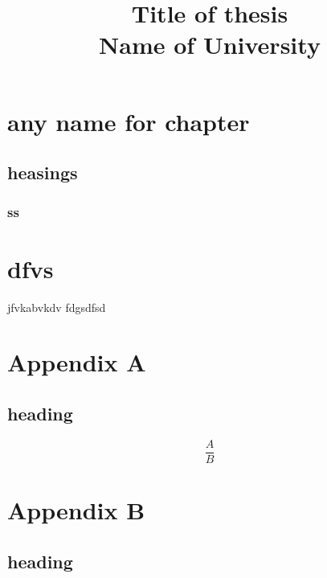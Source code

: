 \documentclass[12pt,twoside]{report}
\title{{Title of thesis}\\{\Large Name of University}}
\begin{document}
\maketitle
\tableofcontents
\listoffigures
\listoftables
\chapter{any name for chapter}
\section{heasings}
\subsection{ss}
\chapter{dfvs}
jfvkabvkdv \cite{Markov}fdgsdfsd
\cite{wells}
\cite{Super}
\begin{appendices}
\chapter*{Appendix A}
\section*{heading}
$$\frac{A}{B}$$
\chapter*{Appendix B}
\section*{heading}
\end{appendices}


\end{document}
